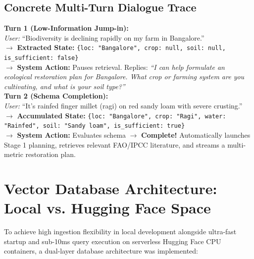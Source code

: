 \documentclass[11pt,a4paper]{article}
\begin{document}
\subsection{Concrete Multi-Turn Dialogue Trace}
\begin{tcolorbox}[colback=boxbg,colframe=darkbg,title={\textbf{Trace: Progressive Schema Fulfillment Across Multi-Turn Chat}},fonttitle=\small\bfseries]
\small
\textbf{Turn 1 (Low-Information Jump-in):}\\
\textit{User:} ``Biodiversity is declining rapidly on my farm in Bangalore.''\\
$\rightarrow$ \textbf{Extracted State:} \texttt{\{loc: "Bangalore", crop: null, soil: null, is\_sufficient: false\}}\\
$\rightarrow$ \textbf{System Action:} Pauses retrieval. Replies: \textit{``I can help formulate an ecological restoration plan for Bangalore. What crop or farming system are you cultivating, and what is your soil type?''}\\[4pt]
\textbf{Turn 2 (Schema Completion):}\\
\textit{User:} ``It's rainfed finger millet (ragi) on red sandy loam with severe crusting.''\\
$\rightarrow$ \textbf{Accumulated State:} \texttt{\{loc: "Bangalore", crop: "Ragi", water: "Rainfed", soil: "Sandy loam", is\_sufficient: true\}}\\
$\rightarrow$ \textbf{System Action:} Evaluates schema $\rightarrow$ \textbf{Complete!} Automatically launches Stage 1 planning, retrieves relevant FAO/IPCC literature, and streams a multi-metric restoration plan.
\end{tcolorbox}

\section{Vector Database Architecture: Local vs. Hugging Face Space}

To achieve high ingestion flexibility in local development alongside ultra-fast startup and sub-10ms query execution on serverless Hugging Face CPU containers, a dual-layer database architecture was implemented:
\end{document}
